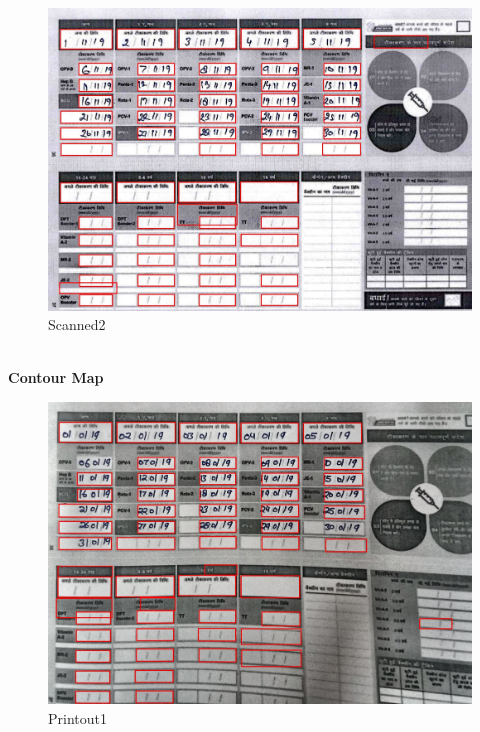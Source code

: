 \documentclass{article}
\begin{document}
    \begin{figure}[!htb]
    \minipage{\textwidth}
    \begin{center}
      \includegraphics[scale=.25]{4/.report/_segmented/_cont/s2.jpg}
      \caption{Scanned2}
    \end{center}
    \endminipage
    \end{figure}
\pagebreak\\
\textbf{Contour Map}
    \begin{figure}[!htb]
    \minipage{\textwidth}
    \begin{center}
      \includegraphics[scale=.25]{4/.report/_segmented/_cont/p1.jpg}
      \caption{Printout1}
    \end{center}
    \endminipage
    \end{figure}
\end{document}
